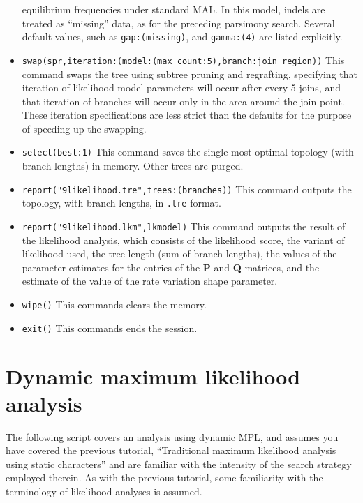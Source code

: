 \begin{itemize}
equilibrium frequencies under standard MAL. In this model, indels are treated as ``missing'' data, as for the 
preceding parsimony search. Several default values, such as \texttt{gap:(missing)}, and \texttt{gamma:(4)} are 
listed explicitly.
\item \texttt{swap(spr,iteration:(model:(max\_count:5),branch:join\_region))} This command swaps the tree using 
subtree pruning and regrafting, specifying that iteration of likelihood model parameters will occur after every 5 
joins, and that iteration of branches will occur only in the area around the join point. These iteration 
specifications are less strict than the defaults for the purpose of speeding up the swapping.
\item \texttt{select(best:1)} This command saves the single most optimal topology (with branch lengths) in 
memory. Other trees are purged.
\item \texttt{report("9likelihood.tre",trees:(branches))} This command outputs the topology, with branch lengths, in 
\texttt{.tre} format.
\item \texttt{report("9likelihood.lkm",lkmodel)} This command outputs the result of the likelihood analysis, which 
consists of the likelihood score, the variant of likelihood used, the tree length (sum of branch lengths), the values 
of the parameter estimates for the entries of the \textbf{P} and \textbf{Q} matrices, and the estimate of the value of 
the rate variation shape parameter.
\item \texttt{wipe()} This commands clears the memory.
\item \texttt{exit()} This commands ends the \poy session.
\end{itemize}

\section{Dynamic maximum likelihood analysis}{\label{tutorial11}}
The following script covers an analysis using dynamic MPL, and assumes you have covered the previous 
tutorial, ``Traditional maximum likelihood analysis using static characters'' and are familiar with the intensity of 
the search strategy employed therein. As with the previous tutorial, some familiarity with the terminology of 
likelihood analyses is assumed.

